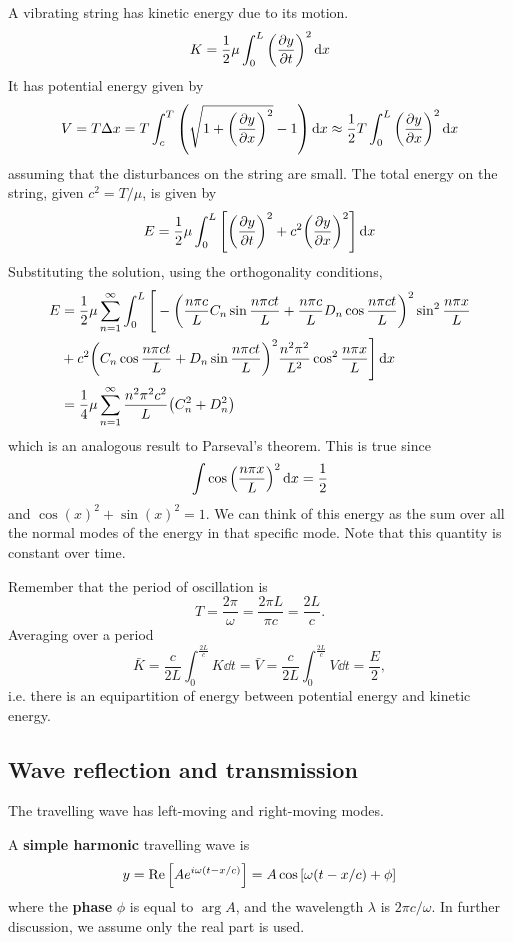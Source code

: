 \documentclass[a4paper]{article}
\begin{document}
A vibrating string has kinetic energy due to its motion.
\[
	K = \frac{1}{2} \mu \int_0^L \qty(\pdv{y}{t})^2 \,\mathrm{d}{x}
\]
It has potential energy given by
\[
	V = T \Delta x = T \int_c^T \qty(\sqrt{1 + \qty(\pdv{y}{x})^2}-1)\,\mathrm{d}{x} \approx \frac{1}{2} T \int_0^L \qty(\pdv{y}{x})^2 \,\mathrm{d}{x}
\]
assuming that the disturbances on the string are small.
The total energy on the string, given \( c^2 = T/\mu \), is given by
\[
	E = \frac{1}{2}\mu \int_0^L \qty[\qty(\pdv{y}{t})^2 + c^2 \qty(\pdv{y}{x})^2] \,\mathrm{d}{x}
\]
Substituting the solution, using the orthogonality conditions,
\begin{align*}
	E & = \frac{1}{2}\mu \sum_{n=1}^\infty \int_0^L \Bigg[-\qty(\frac{n \pi c}{L} C_n \sin \frac{n \pi c t}{L} + \frac{n \pi c}{L} D_n \cos \frac{n \pi c t}{L})^2 \sin^2 \frac{n \pi x}{L} \\
	  & + c^2 \qty(C_n \cos \frac{n \pi c t}{L} + D_n \sin \frac{n \pi c t}{L})^2 \frac{n^2 \pi^2}{L^2} \cos^2 \frac{n \pi x}{L} \Bigg] \,\mathrm{d}{x}                                              \\
	  & = \frac{1}{4} \mu \sum_{n=1}^\infty \frac{n^2 \pi^2 c^2}{L} \qty(C_n^2 + D_n^2)
\end{align*}
which is an analogous result to Parseval's theorem.
This is true since \[
	\int \cos \qty(\frac{n \pi x}{L})^2\,\mathrm{d}{x} = \frac{1}{2}
\] and \( \cos(x)^2 + \sin(x)^2 = 1 \).
We can think of this energy as the sum over all the normal modes of the energy in that specific mode.
Note that this quantity is constant over time.

\begin{note}
    Remember that the period of oscillation is
    \[
    T=\frac{2 \pi}{\omega}=\frac{2 \pi L}{\pi c}=\frac{2 L}{c} .
    \]
    Averaging over a period
    \[
    \bar{K}=\frac{c}{2 L} \int_0^{\frac{2 L}{c}} K \dd t=\bar{V}=\frac{c}{2 L} \int_0^{\frac{2 L}{c}} V \dd t=\frac{E}{2},
    \]
    i.e. there is an equipartition of energy between potential energy and kinetic energy.
\end{note}

\subsection{Wave reflection and transmission}
The travelling wave has left-moving and right-moving modes.

\begin{definition}
    A \textbf{simple harmonic} travelling wave is
    \[
        y = \Re\qty[ A e^{i \omega(t-x/c)} ] = A \cos \qty[\omega(t-x/c) + \phi]
    \]
    where the \textbf{phase} \( \phi \) is equal to \( \arg A \), and the wavelength \( \lambda \) is \( 2 \pi c / \omega \).
    In further discussion, we assume only the real part is used.
\end{definition}
\end{document}
